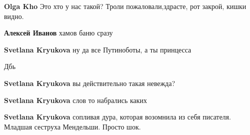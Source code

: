 \begin{itemize}
\begin{itemize}
\textbf{Olga Kho} Это хто у нас такой? Троли пожаловали,здрасте, рот закрой, кишки видно.

 
\textbf{Алексей Иванов} хамов баню сразу

 
\textbf{Svetlana Kryukova} ну да все Путиноботы, а ты принцесса

 
Дбь

 
\textbf{Svetlana Kryukova} вы действительно такая невежда?

 
\textbf{Svetlana Kryukova} слов то набрались каких

 
\textbf{Svetlana Kryukova} сопливая дура, которая возомнила из себя писателя. Младшая сеструха Мендельши. Просто шок.

 

\end{itemize}
\end{itemize}
